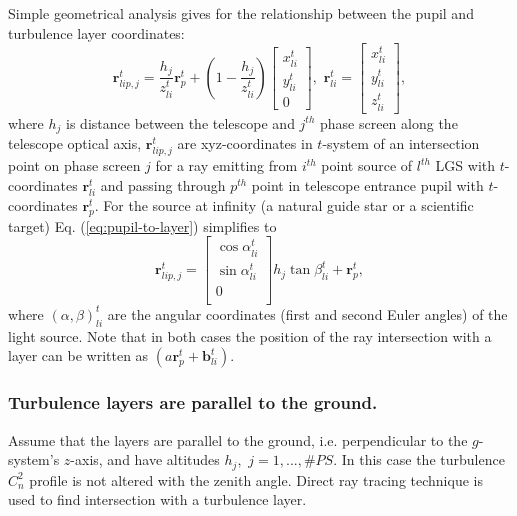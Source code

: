 Simple geometrical analysis gives for the
relationship between the pupil and turbulence layer coordinates:
\begin{equation} \label{eq:pupil-to-layer}
  \bm{r}^{t}_{lip,j} =
  \frac{h_{j}}{z^{t}_{li}} \bm{r}_{p}^{t} +
  (1-\frac{h_{j}}{z^{t}_{li}})
  \left[
  \begin{array}{c}
	  x^{t}_{li} \\
	  y^{t}_{li} \\
	  0
	\end{array}
  \right], \,\,
  \bm{r}^{t}_{li} =
  \left[
  \begin{array}{c}
	  x^{t}_{li} \\
	  y^{t}_{li} \\
	  z^{t}_{li}
	\end{array}
  \right],
\end{equation}
where $h_{j}$ is distance between the telescope and $j^{th}$ phase screen
along the telescope optical axis,
$\bm{r}^{t}_{lip,j}$ are xyz-coordinates in $t$-system of an
intersection point on phase screen $j$ for a ray emitting from $i^{th}$ point
source of $l^{th}$ LGS with $t$-coordinates $\bm{r}^{t}_{li}$ and
passing through $p^{th}$ point in telescope entrance pupil with $t$-coordinates
$\bm{r}^{t}_{p}$. For the source at infinity (a natural guide star or a
scientific target) Eq. (\ref{eq:pupil-to-layer}) simplifies to
\begin{equation} \label{eq:pupil-to-layer-inf}
	\bm{r}^{t}_{lip,j} =
	\left[
	\begin{array}{c}
		\cos \alpha^{t}_{li} \\
		\sin \alpha^{t}_{li} \\
		0 \\
	\end{array}
	\right] h_{j} \tan \beta^{t}_{li} + \bm{r}^{t}_{p},
\end{equation}
where $(\alpha,\beta)^{t}_{li}$ are the angular coordinates (first and second
Euler angles) of the light source. Note that in both cases the position of the
ray intersection with a layer can be written as $ (a \bm{r}_{p}^{t} +
\bm{b}^{t}_{li}) $.

\subsubsection{Turbulence layers are parallel to the ground.}

Assume that the layers are parallel to the ground, i.e. perpendicular to the
$g$-system's $z$-axis, and have altitudes $h_{j}, \,\, j = 1,...,\#PS$. In
this case the turbulence $C_{n}^{2}$ profile is not altered with the zenith
angle. Direct ray tracing technique is used to find intersection with a
turbulence layer.

